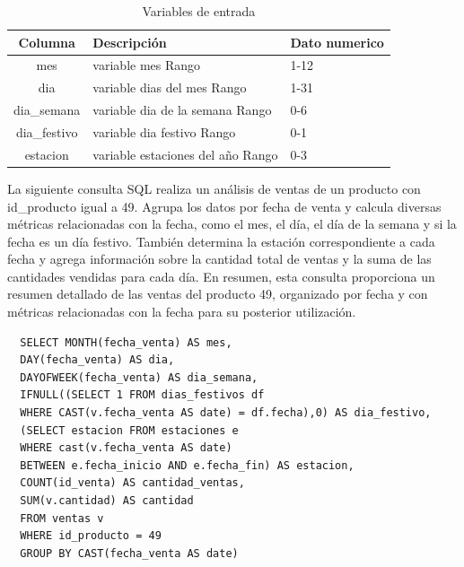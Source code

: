 \begin{table}[H]
    \begin{tabular}{|c|l|l|}  %
      \hline
      \rowcolor{gray!50} \textbf{Columna} & \textbf{Descripción} & \textbf{Dato numerico} \\
      \hline
      mes &  variable mes Rango & 1-12\\
      dia & variable dias del mes Rango & 1-31\\
      dia\_semana & variable dia de la semana Rango & 0-6\\
      dia\_festivo & variable dia festivo Rango& 0-1\\
      estacion & variable estaciones del año Rango& 0-3\\
      \hline
    \end{tabular}
    \centering
    \caption{ Variables de entrada}
    \label{tab:variables_de _entrada} %
  \end{table}


  
La siguiente consulta SQL realiza un análisis de ventas de un producto con id\_producto igual a 49. Agrupa los datos por fecha de venta y calcula diversas métricas relacionadas con la fecha, como el mes, el día, el día de la semana y si la fecha es un día festivo. También determina la estación correspondiente a cada fecha y agrega información sobre la cantidad total de ventas y la suma de las cantidades vendidas para cada día. En resumen, esta consulta proporciona un resumen detallado de las ventas del producto 49, organizado por fecha y con métricas relacionadas con la fecha para su posterior utilización.

\begin{verbatim}
  SELECT MONTH(fecha_venta) AS mes, 
  DAY(fecha_venta) AS dia, 
  DAYOFWEEK(fecha_venta) AS dia_semana, 
  IFNULL((SELECT 1 FROM dias_festivos df 
  WHERE CAST(v.fecha_venta AS date) = df.fecha),0) AS dia_festivo, 
  (SELECT estacion FROM estaciones e 
  WHERE cast(v.fecha_venta AS date) 
  BETWEEN e.fecha_inicio AND e.fecha_fin) AS estacion,
  COUNT(id_venta) AS cantidad_ventas, 
  SUM(v.cantidad) AS cantidad 
  FROM ventas v 
  WHERE id_producto = 49 
  GROUP BY CAST(fecha_venta AS date)
\end{verbatim}

